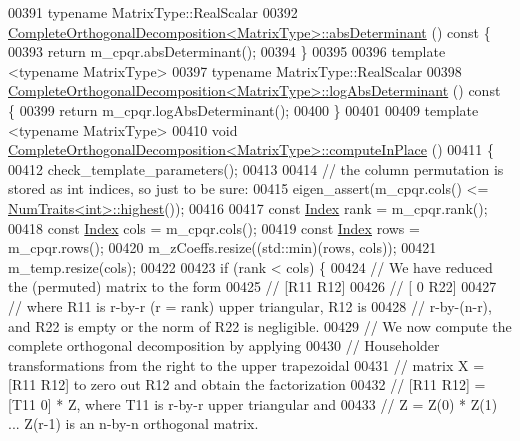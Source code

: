 \begin{DoxyCode}
00391 \textcolor{keyword}{typename} MatrixType::RealScalar
00392 \hyperlink{group___q_r___module_ac040c34ce3fb2b68d3f57adc0c29d526}{CompleteOrthogonalDecomposition<MatrixType>::absDeterminant}
      ()\textcolor{keyword}{ const }\{
00393   \textcolor{keywordflow}{return} m\_cpqr.absDeterminant();
00394 \}
00395 
00396 \textcolor{keyword}{template} <\textcolor{keyword}{typename} MatrixType>
00397 \textcolor{keyword}{typename} MatrixType::RealScalar
00398 \hyperlink{group___q_r___module_ad59d6dc78dab52a0038ac372b4a72c0d}{CompleteOrthogonalDecomposition<MatrixType>::logAbsDeterminant}
      ()\textcolor{keyword}{ const }\{
00399   \textcolor{keywordflow}{return} m\_cpqr.logAbsDeterminant();
00400 \}
00401 
00409 \textcolor{keyword}{template} <\textcolor{keyword}{typename} MatrixType>
00410 \textcolor{keywordtype}{void} \hyperlink{group___q_r___module_adb0b963d7d8f96492904e8eda03efbf5}{CompleteOrthogonalDecomposition<MatrixType>::computeInPlace}
      ()
00411 \{
00412   check\_template\_parameters();
00413 
00414   \textcolor{comment}{// the column permutation is stored as int indices, so just to be sure:}
00415   eigen\_assert(m\_cpqr.cols() <= \hyperlink{group___core___module_struct_eigen_1_1_num_traits}{NumTraits<int>::highest}());
00416 
00417   \textcolor{keyword}{const} \hyperlink{namespace_eigen_a62e77e0933482dafde8fe197d9a2cfde}{Index} rank = m\_cpqr.rank();
00418   \textcolor{keyword}{const} \hyperlink{namespace_eigen_a62e77e0933482dafde8fe197d9a2cfde}{Index} cols = m\_cpqr.cols();
00419   \textcolor{keyword}{const} \hyperlink{namespace_eigen_a62e77e0933482dafde8fe197d9a2cfde}{Index} rows = m\_cpqr.rows();
00420   m\_zCoeffs.resize((std::min)(rows, cols));
00421   m\_temp.resize(cols);
00422 
00423   \textcolor{keywordflow}{if} (rank < cols) \{
00424     \textcolor{comment}{// We have reduced the (permuted) matrix to the form}
00425     \textcolor{comment}{//   [R11 R12]}
00426     \textcolor{comment}{//   [ 0  R22]}
00427     \textcolor{comment}{// where R11 is r-by-r (r = rank) upper triangular, R12 is}
00428     \textcolor{comment}{// r-by-(n-r), and R22 is empty or the norm of R22 is negligible.}
00429     \textcolor{comment}{// We now compute the complete orthogonal decomposition by applying}
00430     \textcolor{comment}{// Householder transformations from the right to the upper trapezoidal}
00431     \textcolor{comment}{// matrix X = [R11 R12] to zero out R12 and obtain the factorization}
00432     \textcolor{comment}{// [R11 R12] = [T11 0] * Z, where T11 is r-by-r upper triangular and}
00433     \textcolor{comment}{// Z = Z(0) * Z(1) ... Z(r-1) is an n-by-n orthogonal matrix.}

\end{DoxyCode}
